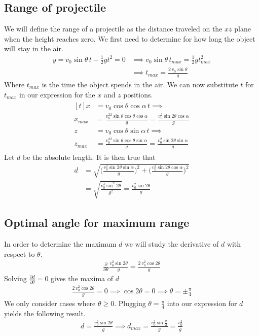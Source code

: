 \documentclass[%
aip,
jmp,
amsmath,amssymb,
reprint,%
]{revtex4-1}
\begin{document}
	\subsection{Range of projectile}
	We will define the range of a projectile as the distance traveled on the $xz$ plane when the height reaches zero. We first need to determine for how long the object will stay in the air.
	\begin{align}\nonumber
		y = v_0 \sin\theta\,t - \frac12gt^2 = 0&\implies v_0 \sin\theta\,t_{max} = \frac12gt_{max}^2\\\label{eq:tMax}
		&\implies t_{max} = \frac{2\,v_0 \sin\theta}{g}
	\end{align}
	Where $t_{max}$ is the time the object spends in the air. We can now substitute $t$ for $t_{max}$ in our expression for the $x$ and $z$ positions.
	\begin{align}\nonumber
		\begin{aligned}[t]
			x &= v_0 \cos\theta\cos\alpha\,t \implies  \\\nonumber
			x_{max} &= \frac{v_0^22\sin\theta\cos\theta\cos\alpha}{g} = \frac{v_0^2 \sin2\theta\cos\alpha}{g}\\\nonumber
			z &= v_0 \cos\theta\sin\alpha\,t \implies\\\nonumber
			z_{max} &= \frac{v_0^22\sin\theta\cos\theta\sin\alpha}{g} = \frac{v_0^2 \sin2\theta\sin\alpha}{g}\nonumber
		\end{aligned}
	\end{align}
	Let $d$ be the absolute length. It is then true that
	\begin{align}\nonumber
		d &= \sqrt{\Big(\frac{v_{0}^2\sin2\theta\sin\alpha}{g}\Big)^2 + \Big(\frac{v_{0}^2\sin2\theta\cos\alpha}{g}\Big)^2}\\\label{eq:distance}
		&=\sqrt{\frac{v_{0}^4\sin^2 2\theta}{g^2}} = \frac{v_{0}^2\sin2\theta}{g}
	\end{align}
	\subsection{Optimal angle for maximum range}
	In order to determine the maximum $d$ we will study the derivative of $d$ with respect to $\theta$.
	\begin{align}\nonumber
		\frac{\partial}{\partial\theta} \frac{v_0^2\sin2\theta}{g} = \frac{2\,v_0^2\cos2\theta}{g}
	\end{align}
	Solving $\frac{\partial d}{\partial \theta} = 0$ gives the maxima of $d$
	\begin{align}\nonumber
		\frac{2\,v_0^2\cos2\theta}{g} = 0 \implies \cos2\theta = 0 \implies \theta = \pm\frac{\pi}{4}
	\end{align}
	We only consider cases where $\theta \geq 0$. Plugging $\theta=\frac{\pi}{4}$ into our expression for $d$ yields the following result.
	\begin{align}\nonumber
		d = \frac{v_{0}^2\sin2\theta}{g} \implies d_{max} = \frac{v_{0}^2\sin\frac\pi2}{g} = \frac{v_{0}^2}{g}
	\end{align}
\end{document}
